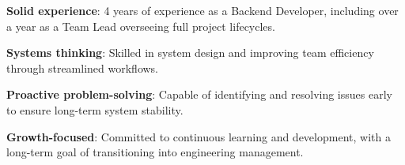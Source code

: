 

\begin{cvbullets}
\item {\textbf{Solid experience}: 4 years of experience as a Backend Developer, including over a year as a Team Lead overseeing full project lifecycles.}
\item {\textbf{Systems thinking}: Skilled in system design and improving team efficiency through streamlined workflows.}
\item {\textbf{Proactive problem-solving}: Capable of identifying and resolving issues early to ensure long-term system stability.}
\item {\textbf{Growth-focused}: Committed to continuous learning and development, with a long-term goal of transitioning into engineering management.}
\end{cvbullets}

